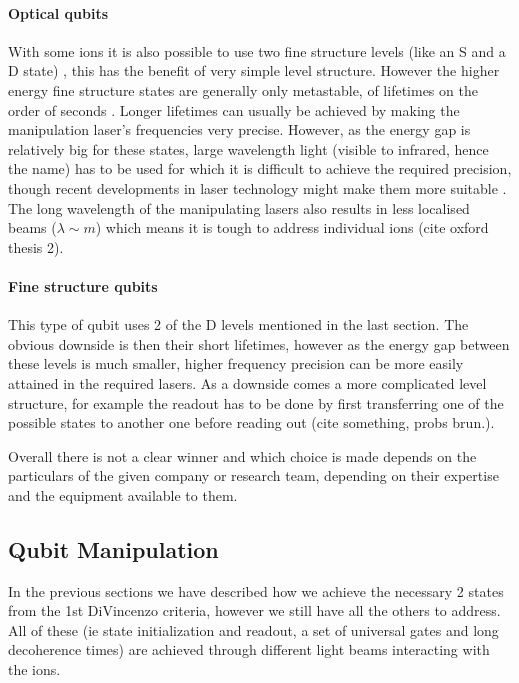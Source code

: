 \paragraph{Optical qubits}
With some ions it is also possible to use two fine structure levels (like an S and a D state) , this has the benefit of very simple level structure.
However the higher energy fine structure states are generally only metastable, of lifetimes on the order of seconds \cite{ozeriTrappedionQubitTool2011}.
Longer lifetimes can usually be achieved by making the manipulation laser's frequencies very precise.
However, as the energy gap is relatively big for these states, large wavelength light (visible to infrared, hence the name) has to be used for which it is difficult to achieve the required precision, though recent developments in laser technology might make them more suitable \cite{bruzewiczTrappedionQuantumComputing2019}.
The long wavelength of the manipulating lasers also results in less localised beams ($\lambda \sim \si{m}$) which means it is tough to address individual ions (cite oxford thesis 2).

\paragraph{Fine structure qubits}
This type of qubit uses 2 of the D levels mentioned in the last section.
The obvious downside is then their short lifetimes, however as the energy gap between these levels is much smaller, higher frequency precision can be more easily attained in the required lasers.
As a downside comes a more complicated level structure, for example the readout has to be done by first transferring one of the possible states to another one before reading out (cite something, probs brun.).


Overall there is not a clear winner and which choice is made depends on the particulars of the given company or research team, depending on their expertise and the equipment available to them.


\subsection{Qubit Manipulation}\label{sec:TIQC_qbmanipulation}
In the previous sections we have described how we achieve the necessary 2 states from the 1st DiVincenzo criteria, however we still have all the others to address.
All of these (ie state initialization and readout, a set of universal gates and long decoherence times) are achieved through different light beams interacting with the ions.

